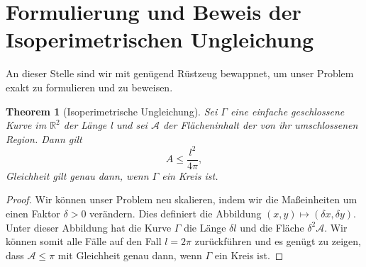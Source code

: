 \documentclass[12pt,a4paper]{article}
\theoremstyle{plain}
\newtheorem{Theorem}{Theorem}[section]
\newcommand{\R}{\mathbb{R}}
\numberwithin{equation}{section}
\begin{document}
\section{Formulierung und Beweis der Isoperimetrischen Ungleichung}
An dieser Stelle sind wir mit genügend Rüstzeug bewappnet, um unser Problem exakt zu formulieren und zu beweisen.
\begin{Theorem}[Isoperimetrische Ungleichung]
Sei $\Gamma$ eine einfache geschlossene Kurve im $\R^2$ der Länge l und sei $\mathcal{A}$ der Flächeninhalt der von ihr umschlossenen Region. Dann gilt
\[ A\leq \frac{l^2}{4\pi}, \]
Gleichheit gilt genau dann, wenn $\Gamma$ ein Kreis ist.
\end{Theorem}
\begin{proof}
Wir können unser Problem neu skalieren, indem wir die Maßeinheiten um einen Faktor $\delta>0$ verändern. Dies definiert die Abbildung $(x,y) \mapsto (\delta x, \delta y)$. Unter dieser Abbildung hat die Kurve $\Gamma$ die Länge $\delta l$ und die Fläche $\delta^2 \mathcal{A}$. Wir können somit alle Fälle auf den Fall $l=2\pi$ zurückführen und es genügt zu zeigen, dass $\mathcal{A}\leq \pi$ mit Gleichheit genau dann, wenn $\Gamma$ ein Kreis ist.


\end{proof}
\end{document}
